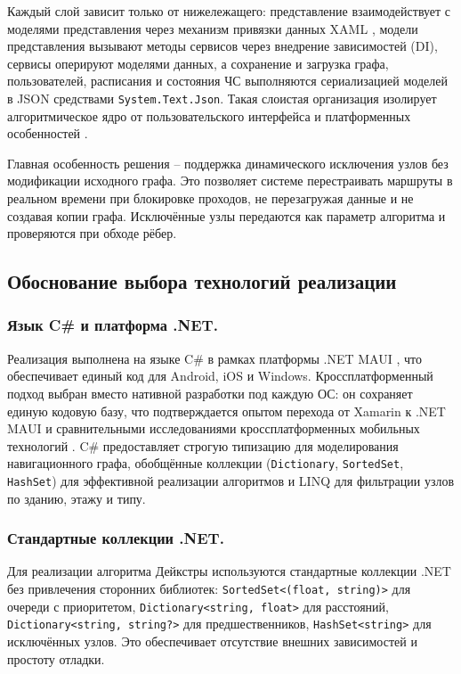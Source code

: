 Каждый слой зависит только от нижележащего: представление взаимодействует с моделями представления через механизм привязки данных XAML \cite{xaml}, модели представления вызывают методы сервисов через внедрение зависимостей (DI), сервисы оперируют моделями данных, а сохранение и загрузка графа, пользователей, расписания и состояния ЧС выполняются сериализацией моделей в JSON средствами \texttt{System.Text.Json}. Такая слоистая организация изолирует алгоритмическое ядро от пользовательского интерфейса и платформенных особенностей \cite{yarovaya2022,marinin2024}.

Главная особенность решения -- поддержка динамического исключения узлов без модификации исходного графа. Это позволяет системе перестраивать маршруты в реальном времени при блокировке проходов, не перезагружая данные и не создавая копии графа. Исключённые узлы передаются как параметр алгоритма и проверяются при обходе рёбер.

\subsection{Обоснование выбора технологий реализации}

\subsubsection{Язык C\# и платформа .NET.}

Реализация выполнена на языке C\# \cite{richter} в рамках платформы .NET MAUI \cite{maui}, что обеспечивает единый код для Android, iOS и Windows. Кроссплатформенный подход выбран вместо нативной разработки под каждую ОС: он сохраняет единую кодовую базу, что подтверждается опытом перехода от Xamarin к .NET MAUI \cite{ershov2021,ilichev2018} и сравнительными исследованиями кроссплатформенных мобильных технологий \cite{zhukovskaya2017,eskendir2019,feshina2022,jia2018}. C\# предоставляет строгую типизацию для моделирования навигационного графа, обобщённые коллекции (\texttt{Dictionary}, \texttt{SortedSet}, \texttt{HashSet}) для эффективной реализации алгоритмов и LINQ для фильтрации узлов по зданию, этажу и типу.

\subsubsection{Стандартные коллекции .NET.} 

Для реализации алгоритма Дейкстры используются стандартные коллекции .NET без привлечения сторонних библиотек: \texttt{SortedSet<(float, string)>} для очереди с приоритетом, \texttt{Dictionary<string, float>} для расстояний, \texttt{Dictionary<string, string?>} для предшественников, \texttt{HashSet<string>} для исключённых узлов. Это обеспечивает отсутствие внешних зависимостей и простоту отладки.

